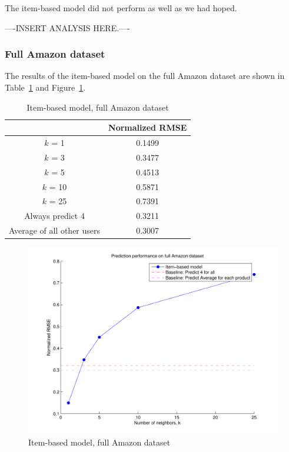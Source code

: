 \documentclass[letterpaper, 11 pt, conference]{ieeeconf}
\begin{document}
The item-based model did not perform as well as we had hoped.

----INSERT ANALYSIS HERE.----

\subsubsection{Full Amazon dataset}
The results of the item-based model on the full Amazon dataset 
are shown in Table~\ref{table:modeltwo_full} and Figure~\ref{fig:modeltwo_full}.

\begin{table}[htb]
\centering
\begin{tabular}{|c|c|}
\cline{2-2}

\multicolumn{1}{c|}{}  & {Normalized RMSE} \tabularnewline \hline
$k$ = 1 & 0.1499 \tabularnewline
$k$ = 3 & 0.3477 \tabularnewline
$k$ = 5 & 0.4513 \tabularnewline
$k$ = 10 & 0.5871 \tabularnewline
$k$ = 25 & 0.7391 \tabularnewline
\hline
Always predict 4 & 0.3211 \tabularnewline 
Average of all other users & 0.3007 \tabularnewline

\hline
\end{tabular}
\caption{Item-based model, full Amazon dataset}
\label{table:modeltwo_full}
\end{table}

\begin{figure}[h]
\includegraphics[scale=0.6]{images/modeltwo_full.pdf}
\caption{Item-based model, full Amazon dataset}
\label{fig:modeltwo_full}
\end{figure}
\end{document}

